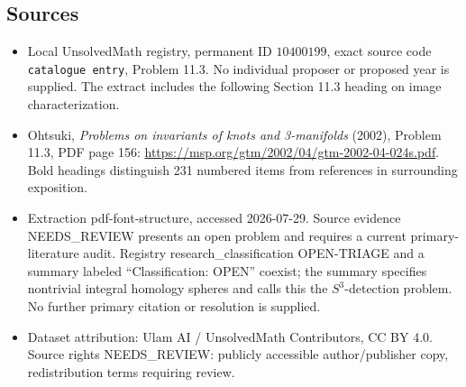 \documentclass[11pt]{article}
\begin{document}
\subsection{Sources}
\begin{itemize}
\item Local UnsolvedMath registry, permanent ID \(10400199\), exact source code \texttt{catalogue entry}, Problem 11.3. No individual proposer or proposed year is supplied. The extract includes the following Section 11.3 heading on image characterization.
\item Ohtsuki, \emph{Problems on invariants of knots and 3-manifolds} (2002), Problem 11.3, PDF page 156: \url{https://msp.org/gtm/2002/04/gtm-2002-04-024s.pdf}. Bold headings distinguish 231 numbered items from references in surrounding exposition.
\item Extraction pdf-font-structure, accessed 2026-07-29. Source evidence NEEDS\_REVIEW presents an open problem and requires a current primary-literature audit. Registry research\_classification OPEN-TRIAGE and a summary labeled ``Classification: OPEN'' coexist; the summary specifies nontrivial integral homology spheres and calls this the \(S^3\)-detection problem. No further primary citation or resolution is supplied.
\item Dataset attribution: Ulam AI / UnsolvedMath Contributors, CC BY 4.0. Source rights NEEDS\_REVIEW: publicly accessible author/publisher copy, redistribution terms requiring review.
\end{itemize}
\end{document}

